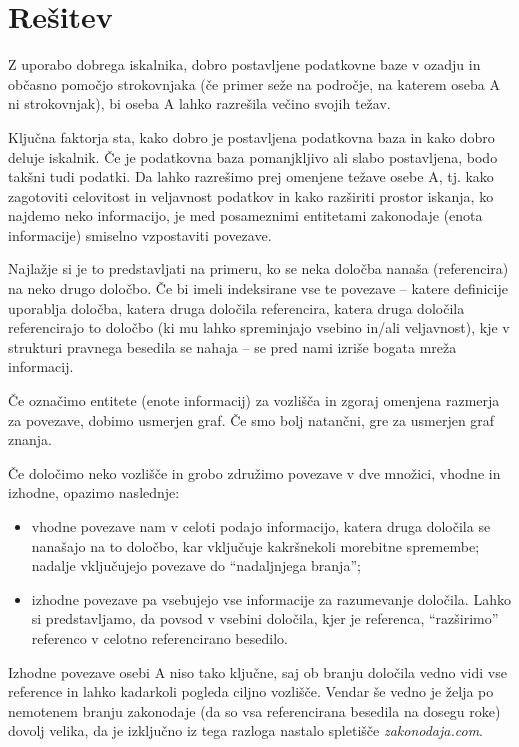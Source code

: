\documentclass[a4paper,12pt,openright]{book}
\begin{document}
\section{Rešitev}

Z uporabo dobrega iskalnika, dobro postavljene podatkovne baze v ozadju in občasno pomočjo strokovnjaka (če primer seže na področje, na katerem oseba A ni strokovnjak), bi oseba A lahko razrešila večino svojih težav.

Ključna faktorja sta, kako dobro je postavljena podatkovna baza in kako dobro deluje iskalnik. Če je podatkovna baza pomanjkljivo ali slabo postavljena, bodo takšni tudi podatki. Da lahko razrešimo prej omenjene težave osebe A, tj. kako zagotoviti celovitost in veljavnost podatkov in kako razširiti prostor iskanja, ko najdemo neko informacijo, je med posameznimi entitetami zakonodaje (enota informacije) smiselno vzpostaviti povezave.

Najlažje si je to predstavljati na primeru, ko se neka določba nanaša (referencira) na neko drugo določbo. Če bi imeli indeksirane vse te povezave – katere definicije uporablja določba, katera druga določila referencira, katera druga določila referencirajo to določbo (ki mu lahko spreminjajo vsebino in/ali veljavnost), kje v strukturi pravnega besedila se nahaja – se pred nami izriše bogata mreža informacij.

Če označimo entitete (enote informacij) za vozlišča in zgoraj omenjena razmerja za povezave, dobimo usmerjen graf. Če smo bolj natančni, gre za usmerjen graf znanja.

Če določimo neko vozlišče in grobo združimo povezave v dve množici, vhodne in izhodne, opazimo naslednje:
\begin{itemize}
	\item vhodne povezave nam v celoti podajo informacijo, katera druga določila se nanašajo na to določbo, kar vključuje kakršnekoli morebitne spremembe; nadalje vključujejo povezave do “nadaljnjega branja”;
	\item izhodne povezave pa vsebujejo vse informacije za razumevanje določila. Lahko si predstavljamo, da povsod v vsebini določila, kjer je referenca, “razširimo” referenco v celotno referencirano besedilo.
\end{itemize}

Izhodne povezave osebi A niso tako ključne, saj ob branju določila vedno vidi vse reference in lahko kadarkoli pogleda ciljno vozlišče. Vendar še vedno je želja po nemotenem branju zakonodaje (da so vsa referencirana besedila na dosegu roke) dovolj velika, da je izključno iz tega razloga nastalo spletišče \textit{zakonodaja.com}.
\end{document}
